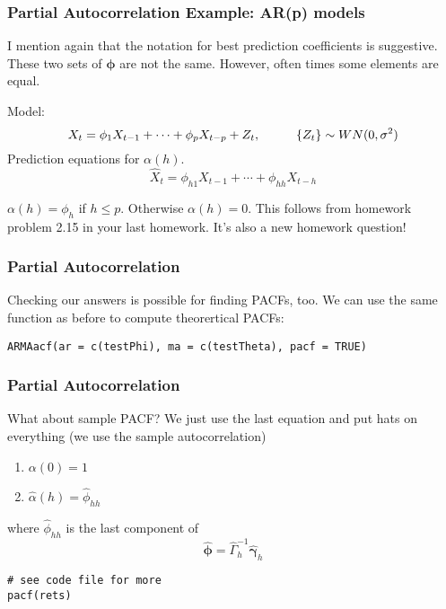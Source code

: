 \documentclass{beamer}
\begin{document}

\begin{frame}
\frametitle{Partial Autocorrelation Example: AR(p) models}

I mention again that the notation for best prediction coefficients is suggestive. These two sets of $\bm{\phi}$ are not the same. However, often times some elements are equal. 
\newline

Model:
\[
X_t = \phi_1 X_{t-1} + \cdots + \phi_p X_{t-p} + Z_t, \hspace{10mm} \{Z_t\} \sim WN(0, \sigma^2)
\]
Prediction equations for $\alpha(h)$. 
\[
\hat{X}_t = \phi_{h1}X_{t-1} + \cdots + \phi_{hh}X_{t-h}
\]

$\alpha(h) = \phi_h$ if $h \le p$. Otherwise $\alpha(h) = 0$. This follows from homework problem 2.15 in your last homework. It's also a new homework question!
\end{frame}




\begin{frame}[fragile]
\frametitle{Partial Autocorrelation}

Checking our answers is possible for finding PACFs, too. We can use the same function as before to compute theorertical PACFs:

\begin{verbatim}
ARMAacf(ar = c(testPhi), ma = c(testTheta), pacf = TRUE)
\end{verbatim}


\end{frame}



\begin{frame}[fragile]
\frametitle{Partial Autocorrelation}

What about sample PACF? We just use the last equation and put hats on everything (we use the sample autocorrelation)

\begin{enumerate}
\item $\alpha(0) = 1$
\item $\hat{\alpha}(h) = \hat{\phi}_{hh}$
\end{enumerate}
where $\hat{\phi}_{hh}$ is the last component of 
\[
\hat{\bm{\phi}} = \hat{\Gamma}_h^{-1} \hat{\bm{\gamma}}_h
\]

\begin{verbatim}
# see code file for more
pacf(rets)
\end{verbatim}

\end{frame}
\end{document}
